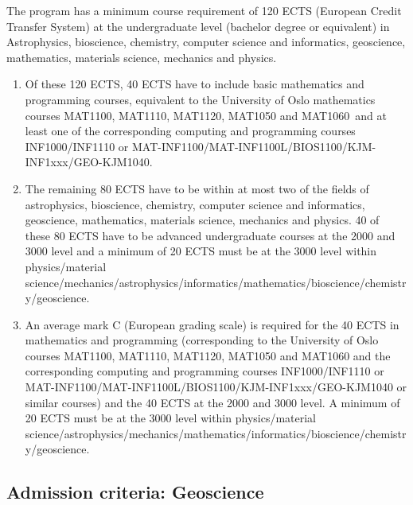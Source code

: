 \documentclass[%
oneside,                 %
final,                   %
10pt]{article}
\begin{document}
The program has a minimum course requirement of 120 ECTS (European Credit Transfer System) at the undergraduate level (bachelor degree or equivalent) in Astrophysics, bioscience, chemistry, computer science and informatics, geoscience, mathematics, materials science, mechanics and physics. 
\begin{enumerate}
\item Of these 120 ECTS, 40 ECTS have to include basic mathematics and programming courses, equivalent to the University of Oslo mathematics courses MAT1100, MAT1110, MAT1120, MAT1050 and MAT1060 and at least one of the corresponding computing and programming courses INF1000/INF1110 or MAT-INF1100/MAT-INF1100L/BIOS1100/KJM-INF1xxx/GEO-KJM1040. 

\item The remaining 80 ECTS have to be within at most two of the fields of astrophysics, bioscience, chemistry, computer science and informatics, geoscience, mathematics, materials science, mechanics and physics. 40 of these 80 ECTS have to be advanced undergraduate courses at the 2000 and 3000 level and a minimum of 20 ECTS must be at the 3000 level within physics/material science/mechanics/astrophysics/informatics/mathematics/bioscience/chemistry/geoscience.

\item An average mark C (European grading scale) is required for the 40 ECTS in mathematics and programming (corresponding  to the University of Oslo courses  MAT1100, MAT1110, MAT1120, MAT1050 and MAT1060  and the corresponding computing and programming courses INF1000/INF1110 or MAT-INF1100/MAT-INF1100L/BIOS1100/KJM-INF1xxx/GEO-KJM1040 or similar courses) and the 40 ECTS at the 2000 and 3000 level. A minimum of 20 ECTS must be at the 3000 level within physics/material science/astrophysics/mechanics/mathematics/informatics/bioscience/chemistry/geoscience.
\end{enumerate}

\noindent
\subsection{Admission criteria: Geoscience}
\end{document}
